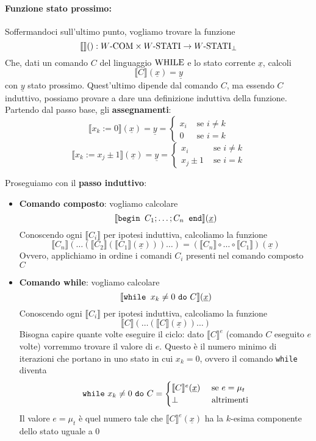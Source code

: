 \paragraph{Funzione stato prossimo:} Soffermandoci sull'ultimo punto, vogliamo trovare la funzione
$$  \llbracket \rrbracket (): W\text{-COM} \times W\text{-STATI} \rightarrow W\text{-STATI}_\bot $$
Che, dati un comando $C$ del linguaggio $\text{WHILE}$ e lo stato corrente $\underline{x}$, calcoli
$$ \llbracket C \rrbracket (\underline{x}) = \underline{y} $$
con $\underline{y}$ stato prossimo. Quest'ultimo dipende dal comando $C$, ma essendo $C$ induttivo, possiamo provare a dare una definizione induttiva della funzione.\\

Partendo dal passo base, gli \textbf{assegnamenti}:
$$
\llbracket x_k := 0 \rrbracket (\underline{x}) = \underline{y} = \begin{cases}
	x_i & \text{ se } i \neq k \\
	0 & \text{ se } i = k
\end{cases}
$$
$$ 
\llbracket x_k := x_j \pm 1 \rrbracket (\underline{x}) = \underline{y} = \begin{cases}
	x_i & \text{ se } i \neq k \\
	x_j \pm 1 & \text{ se } i = k
\end{cases}
$$

Proseguiamo con il \textbf{passo induttivo}:
\begin{itemize}
	\item \textbf{Comando composto}: vogliamo calcolare
	$$ \llbracket \text{\texttt{begin }} C_1; \dots; C_n \text{\texttt{ end}} \rrbracket (\underline{x}) $$
	Conoscendo ogni $\llbracket C_i \rrbracket$ per ipotesi induttiva, calcoliamo la funzione
	$$ \llbracket C_n \rrbracket \left(\dots \left(\llbracket C_2 \rrbracket \left(\llbracket C_1 \rrbracket (\underline{x})\right)\right) \dots \right) = \left(\llbracket C_n \rrbracket \circ \dots \circ \llbracket C_1 \rrbracket \right) (\underline{x}) $$
	Ovvero, applichiamo in ordine i comandi $C_i$ presenti nel comando composto $C$
	
	\item \textbf{Comando while}: vogliamo calcolare
	$$ \llbracket \text{\texttt{while }} x_k \neq 0 \text{ \texttt{do} } C \rrbracket (\underline{x}) $$
	Conoscendo ogni $\llbracket C_i \rrbracket$ per ipotesi induttiva, calcoliamo la funzione 
	$$ \llbracket C \rrbracket \left(\dots \left(\llbracket C \rrbracket (\underline{x})\right) \dots \right) $$
	Bisogna capire quante volte eseguire il ciclo: dato $\llbracket C \rrbracket^e$ (comando $C$ eseguito $e$ volte) vorremmo trovare il valore di $e$. Questo è il numero minimo di iterazioni che portano in uno stato in cui $x_k = 0$, ovvero il comando \texttt{while} diventa
	$$ \text{\texttt{while} } x_k \neq 0 \text{ \texttt{do} } C = \begin{cases}
		\llbracket C \rrbracket^e (\underline{x}) & \text{ se } e = \mu_t \\
		\bot & \text{ altrimenti}
	\end{cases}$$
	Il valore $e = \mu_t$ è quel numero tale che $\llbracket C \rrbracket^e (\underline{x})$ ha  la $k$-esima componente dello stato uguale a 0
\end{itemize}


